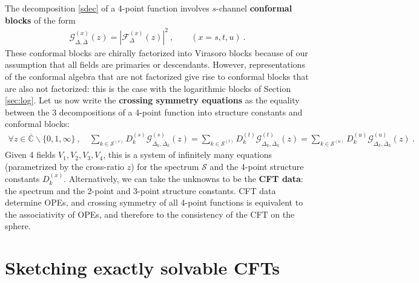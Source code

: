 \documentclass[12pt, a4paper]{article}
\newcommand{\myindex}[1]{\textbf{\boldmath #1}}
\begin{document}
The decomposition \eqref{sdec} of a 4-point function involves $s$-channel \myindex{conformal blocks} of the form
\begin{align}
 \mathcal{G}^{(x)}_{\Delta,\bar\Delta}(z) = \left|\mathcal{F}_{\Delta}^{(x)}(z)\right|^2\ , \qquad (x=s,t,u)\ . 
 \label{gf2}
\end{align}
These conformal blocks are chirally factorized into Virasoro blocks because of our assumption that all fields are primaries or descendants. However, representations of the conformal algebra that are not factorized give rise to conformal blocks that are also not factorized: this is the case with the logarithmic blocks of Section \ref{sec:log}. Let us now write the \myindex{crossing symmetry equations} as the equality between the 3 decompositions of a 4-point function into structure constants and conformal blocks:
\begin{align}
 \boxed{\forall z\in \overline{\mathbb{C}}\backslash\{0,1,\infty\} \ , \quad 
 \sum_{k\in\mathcal{S}^{(s)}} D_k^{(s)} \mathcal{G}^{(s)}_{\Delta_k,\bar\Delta_k}(z) 
 = \sum_{k\in\mathcal{S}^{(t)}} D_k^{(t)} \mathcal{G}^{(t)}_{\Delta_k,\bar\Delta_k}(z) 
 = \sum_{k\in\mathcal{S}^{(u)}} D_k^{(u)} \mathcal{G}^{(u)}_{\Delta_k,\bar\Delta_k}(z)} \ . 
 \label{seteu}
\end{align}
Given 4 fields $V_1,V_2,V_3,V_4$, this is a system of infinitely many equations (parametrized by the cross-ratio $z$) for the spectrum $\mathcal{S}$ and the 4-point structure constants $D_k^{(x)}$. Alternatively, we can take the unknowns to be the \myindex{CFT data}: the spectrum and the 2-point and 3-point structure constants. CFT data determine OPEs, and crossing symmetry of all 4-point functions is equivalent to the associativity of OPEs, and therefore to the consistency of the CFT on the sphere. 


\section{Sketching exactly solvable CFTs}\label{sec:sesc}
\end{document}
